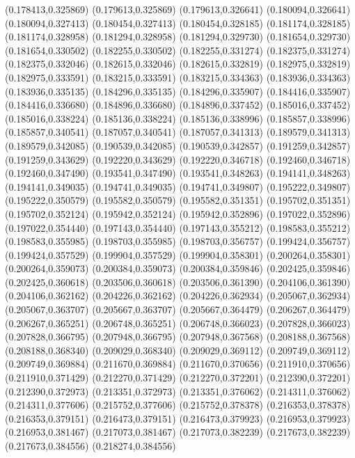 (0.178413,0.325869)
(0.179613,0.325869)
(0.179613,0.326641)
(0.180094,0.326641)
(0.180094,0.327413)
(0.180454,0.327413)
(0.180454,0.328185)
(0.181174,0.328185)
(0.181174,0.328958)
(0.181294,0.328958)
(0.181294,0.329730)
(0.181654,0.329730)
(0.181654,0.330502)
(0.182255,0.330502)
(0.182255,0.331274)
(0.182375,0.331274)
(0.182375,0.332046)
(0.182615,0.332046)
(0.182615,0.332819)
(0.182975,0.332819)
(0.182975,0.333591)
(0.183215,0.333591)
(0.183215,0.334363)
(0.183936,0.334363)
(0.183936,0.335135)
(0.184296,0.335135)
(0.184296,0.335907)
(0.184416,0.335907)
(0.184416,0.336680)
(0.184896,0.336680)
(0.184896,0.337452)
(0.185016,0.337452)
(0.185016,0.338224)
(0.185136,0.338224)
(0.185136,0.338996)
(0.185857,0.338996)
(0.185857,0.340541)
(0.187057,0.340541)
(0.187057,0.341313)
(0.189579,0.341313)
(0.189579,0.342085)
(0.190539,0.342085)
(0.190539,0.342857)
(0.191259,0.342857)
(0.191259,0.343629)
(0.192220,0.343629)
(0.192220,0.346718)
(0.192460,0.346718)
(0.192460,0.347490)
(0.193541,0.347490)
(0.193541,0.348263)
(0.194141,0.348263)
(0.194141,0.349035)
(0.194741,0.349035)
(0.194741,0.349807)
(0.195222,0.349807)
(0.195222,0.350579)
(0.195582,0.350579)
(0.195582,0.351351)
(0.195702,0.351351)
(0.195702,0.352124)
(0.195942,0.352124)
(0.195942,0.352896)
(0.197022,0.352896)
(0.197022,0.354440)
(0.197143,0.354440)
(0.197143,0.355212)
(0.198583,0.355212)
(0.198583,0.355985)
(0.198703,0.355985)
(0.198703,0.356757)
(0.199424,0.356757)
(0.199424,0.357529)
(0.199904,0.357529)
(0.199904,0.358301)
(0.200264,0.358301)
(0.200264,0.359073)
(0.200384,0.359073)
(0.200384,0.359846)
(0.202425,0.359846)
(0.202425,0.360618)
(0.203506,0.360618)
(0.203506,0.361390)
(0.204106,0.361390)
(0.204106,0.362162)
(0.204226,0.362162)
(0.204226,0.362934)
(0.205067,0.362934)
(0.205067,0.363707)
(0.205667,0.363707)
(0.205667,0.364479)
(0.206267,0.364479)
(0.206267,0.365251)
(0.206748,0.365251)
(0.206748,0.366023)
(0.207828,0.366023)
(0.207828,0.366795)
(0.207948,0.366795)
(0.207948,0.367568)
(0.208188,0.367568)
(0.208188,0.368340)
(0.209029,0.368340)
(0.209029,0.369112)
(0.209749,0.369112)
(0.209749,0.369884)
(0.211670,0.369884)
(0.211670,0.370656)
(0.211910,0.370656)
(0.211910,0.371429)
(0.212270,0.371429)
(0.212270,0.372201)
(0.212390,0.372201)
(0.212390,0.372973)
(0.213351,0.372973)
(0.213351,0.376062)
(0.214311,0.376062)
(0.214311,0.377606)
(0.215752,0.377606)
(0.215752,0.378378)
(0.216353,0.378378)
(0.216353,0.379151)
(0.216473,0.379151)
(0.216473,0.379923)
(0.216953,0.379923)
(0.216953,0.381467)
(0.217073,0.381467)
(0.217073,0.382239)
(0.217673,0.382239)
(0.217673,0.384556)
(0.218274,0.384556)
